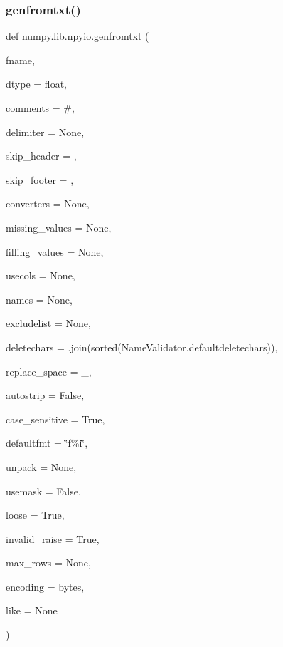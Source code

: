 \subsubsection{\texorpdfstring{genfromtxt()}{genfromtxt()}}
{\footnotesize\ttfamily def numpy.\+lib.\+npyio.\+genfromtxt (\begin{DoxyParamCaption}\item[{}]{fname,  }\item[{}]{dtype = {\ttfamily float},  }\item[{}]{comments = {\ttfamily \textquotesingle{}\#\textquotesingle{}},  }\item[{}]{delimiter = {\ttfamily None},  }\item[{}]{skip\+\_\+header = {},  }\item[{}]{skip\+\_\+footer = {},  }\item[{}]{converters = {\ttfamily None},  }\item[{}]{missing\+\_\+values = {\ttfamily None},  }\item[{}]{filling\+\_\+values = {\ttfamily None},  }\item[{}]{usecols = {\ttfamily None},  }\item[{}]{names = {\ttfamily None},  }\item[{}]{excludelist = {\ttfamily None},  }\item[{}]{deletechars = {\ttfamily \textquotesingle{}\textquotesingle{}.join(sorted(NameValidator.defaultdeletechars))},  }\item[{}]{replace\+\_\+space = {\ttfamily \textquotesingle{}\+\_\+\textquotesingle{}},  }\item[{}]{autostrip = {\ttfamily False},  }\item[{}]{case\+\_\+sensitive = {\ttfamily True},  }\item[{}]{defaultfmt = {\ttfamily \char`\"{}f\%i\char`\"{}},  }\item[{}]{unpack = {\ttfamily None},  }\item[{}]{usemask = {\ttfamily False},  }\item[{}]{loose = {\ttfamily True},  }\item[{}]{invalid\+\_\+raise = {\ttfamily True},  }\item[{}]{max\+\_\+rows = {\ttfamily None},  }\item[{}]{encoding = {\ttfamily \textquotesingle{}bytes\textquotesingle{}},  }\item[{}]{like = {\ttfamily None} }\end{DoxyParamCaption})}

